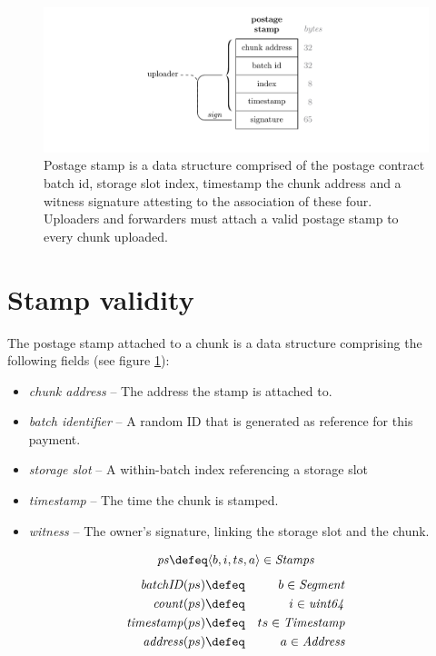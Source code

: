 \begin{figure}[htbp]
  \centering
    \includegraphics[width=\textwidth]{fig/postage-stamp-structure.pdf}
  \caption[Postage stamp]{Postage stamp is a data structure comprised of the postage contract batch id, storage slot index, timestamp the chunk address and a witness signature attesting to the association of these four. Uploaders and forwarders must attach a valid postage stamp to every chunk uploaded. }
  \label{fig:postage-stamp}
\end{figure}

\section{Stamp validity}

The postage stamp attached to a chunk is a data structure comprising the following fields (see figure  \ref{fig:postage-stamp}):

\begin{itemize}[noitemsep]
    \item \emph{chunk address} -- The address the stamp is attached to. 
    \item \emph{batch identifier} --  A random ID that is generated as reference for this payment.
    \item \emph{storage slot} -- A within-batch index referencing a storage slot
    \item \emph{timestamp} -- The time the chunk is stamped. 
    \item \emph{witness} -- The owner's signature, linking the storage slot and the chunk.
\end{itemize}

\begin{definition}
\label{def:postage-stamp}

\begin{equation}
\mathit{ps} \defeq \langle  b,i,ts,a\rangle\in \mathit{Stamps} 
\end{equation}
\begin{eqnarray}    
\mathit{batchID}(ps) &\defeq& b \in\mathit{Segment}
\\
\mathit{count}(ps) &\defeq &i \in\mathit{uint64}
\\
\mathit{timestamp}(ps)&\defeq &ts \in\mathit{Timestamp}
\\
\mathit{address}(ps) &\defeq &a \in\mathit{Address}
\end{eqnarray}

\end{definition}


